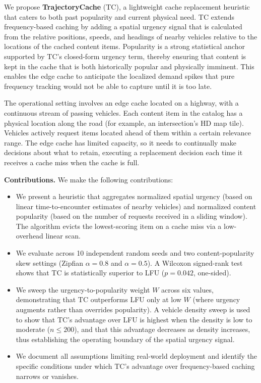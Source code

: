 \documentclass[preprint,12pt]{elsarticle}
\begin{document}
	We propose \textbf{TrajectoryCache} (TC), a lightweight cache replacement heuristic that caters to both past popularity and current physical need. TC extends frequency-based caching by adding a spatial urgency signal that is calculated from the relative positions, speeds, and headings of nearby vehicles relative to the locations of the cached content items. Popularity is a strong statistical anchor supported by TC's closed-form urgency term, thereby ensuring that content is kept in the cache that is both historically popular and physically imminent. This enables the edge cache to anticipate the localized demand spikes that pure frequency tracking would not be able to capture until it is too late. 
	
	The operational setting involves an edge cache located on a highway, with a continuous stream of passing vehicles. Each content item in the catalog has a physical location along the road (for example, an intersection's HD map tile). Vehicles actively request items located ahead of them within a certain relevance range. The edge cache has limited capacity, so it needs to continually make decisions about what to retain, executing a replacement decision each time it receives a cache miss when the cache is full.
	
	\textbf{Contributions.} We make the following contributions:
	\begin{itemize}
		\item We present a heuristic that aggregates normalized spatial urgency (based on linear time-to-encounter estimates of nearby vehicles) and normalized content popularity (based on the number of requests received in a sliding window). The algorithm evicts the lowest-scoring item on a cache miss via a low-overhead linear scan.
		\item We evaluate across 10 independent random seeds and two content-popularity skew settings (Zipfian $\alpha = 0.8$ and $\alpha = 0.5$). A Wilcoxon signed-rank test shows that TC is statistically superior to LFU ($p = 0.042$, one-sided).
		\item We sweep the urgency-to-popularity weight $W$ across six values, demonstrating that TC outperforms LFU only at low $W$ (where urgency augments rather than overrides popularity). A vehicle density sweep is used to show that TC's advantage over LFU is highest when the density is low to moderate ($n \leq 200$), and that this advantage decreases as density increases, thus establishing the operating boundary of the spatial urgency signal.
		\item We document all assumptions limiting real-world deployment and identify the specific conditions under which TC's advantage over frequency-based caching narrows or vanishes.
	\end{itemize}
	
\end{document}
